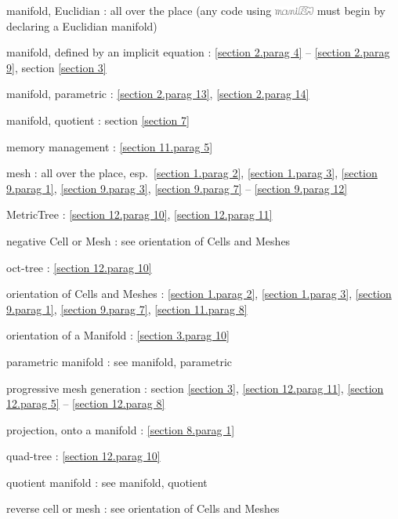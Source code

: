 \documentclass[a4paper]{scrreprt}
\def\numb{}
\newcommand\maniFEM{\leavevmode\hbox{\includegraphics[width=13mm]{manifem-small}}}
\newcommand\verm[1]{\textcolor{manif}{#1}}
\renewcommand\tt{\normalfont\ttfamily}
\begin{document}
\noindent
manifold, Euclidian : all over the place\hfil\break
\hglue 15mm (any code using {\maniFEM} must begin by declaring a Euclidian manifold)

\noindent
manifold, defined by an implicit equation :
\ref{\numb section 2.\numb parag 4} -- \ref{\numb section 2.\numb parag 9},
section \ref{\numb section 3}

\noindent
manifold, parametric : \ref{\numb section 2.\numb parag 13},
\ref{\numb section 2.\numb parag 14}

\noindent
manifold, quotient : section \ref{\numb section 7}

\noindent
memory management : \ref{\numb section 11.\numb parag 5}

\noindent
mesh : all over the place, esp.\ \ref{\numb section 1.\numb parag 2},
\ref{\numb section 1.\numb parag 3}, \ref{\numb section 9.\numb parag 1},
\ref{\numb section 9.\numb parag 3},
\ref{\numb section 9.\numb parag 7} -- \ref{\numb section 9.\numb parag 12}

\noindent
{\small\tt \verm{MetricTree}} : \ref{\numb section 12.\numb parag 10},
\ref{\numb section 12.\numb parag 11}

\noindent
negative {\small\tt \verm{Cell}} or {\small\tt \verm{Mesh}} :
see orientation of {\small\tt \verm{Cell}}s and {\small\tt \verm{Mesh}}es

\noindent
oct-tree : \ref{\numb section 12.\numb parag 10}

\noindent
orientation of {\small\tt \verm{Cell}}s and {\small\tt \verm{Mesh}}es :
\ref{\numb section 1.\numb parag 2},
\ref{\numb section 1.\numb parag 3}, \ref{\numb section 9.\numb parag 1},
\ref{\numb section 9.\numb parag 7}, \ref{\numb section 11.\numb parag 8}

\noindent
orientation of a {\small\tt \verm{Manifold}} : \ref{\numb section 3.\numb parag 10}

\noindent
parametric manifold : see manifold, parametric

\noindent
progressive mesh generation : section \ref{\numb section 3},
\ref{\numb section 12.\numb parag 11},
\ref{\numb section 12.\numb parag 5} -- \ref{\numb section 12.\numb parag 8}

\noindent
projection, onto a manifold :
\ref{\numb section 8.\numb parag 1}

\noindent
quad-tree : \ref{\numb section 12.\numb parag 10}

\noindent
quotient manifold : see manifold, quotient

\noindent
reverse cell or mesh : see orientation of {\small\tt \verm{Cell}}s and {\small\tt \verm{Mesh}}es
\end{document}
